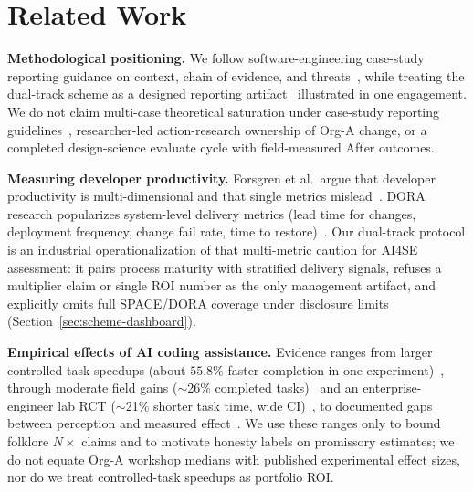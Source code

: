 \documentclass[10pt,conference]{IEEEtran}
\begin{document}
\section{Related Work}
\label{sec:related}

\textbf{Methodological positioning.}
We follow software-engineering case-study reporting guidance on context, chain of evidence, and threats~\cite{Runeson2009CaseStudy}, while treating the dual-track scheme as a designed reporting artifact~\cite{Hevner2004DSR} illustrated in one engagement.
We do not claim multi-case theoretical saturation under case-study reporting guidelines~\cite{Runeson2009CaseStudy}, researcher-led action-research ownership of Org-A change, or a completed design-science evaluate cycle with field-measured After outcomes.

\textbf{Measuring developer productivity.}
Forsgren et al.\ argue that developer productivity is multi-dimensional and that single metrics mislead~\cite{Forsgren2021SPACE}.
DORA research popularizes system-level delivery metrics (lead time for changes, deployment frequency, change fail rate, time to restore)~\cite{Forsgren2018Accelerate}.
Our dual-track protocol is an industrial operationalization of that multi-metric caution for AI4SE assessment: it pairs process maturity with stratified delivery signals, refuses a multiplier claim or single ROI number as the only management artifact, and explicitly omits full SPACE/DORA coverage under disclosure limits (Section~\ref{sec:scheme-dashboard}).

\textbf{Empirical effects of AI coding assistance.}
Evidence ranges from larger controlled-task speedups (about $55.8\%$ faster completion in one experiment)~\cite{Peng2023Copilot}, through moderate field gains ($\sim$26\% completed tasks)~\cite{Cui2026GenAIField} and an enterprise-engineer lab RCT ($\sim$21\% shorter task time, wide CI)~\cite{Paradis2024GoogleAISpeed}, to documented gaps between perception and measured effect~\cite{METR2025AIProductivity}.
We use these ranges only to bound folklore $N\times$ claims and to motivate honesty labels on promissory estimates; we do not equate Org-A workshop medians with published experimental effect sizes, nor do we treat controlled-task speedups as portfolio ROI.
\end{document}
